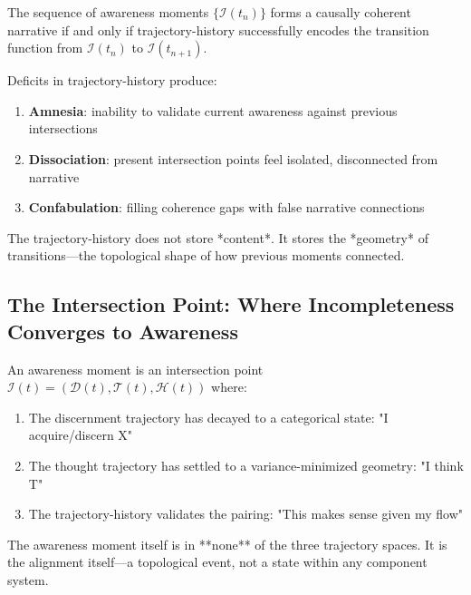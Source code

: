 \begin{theorem}
\label{thm:coherence-history}
The sequence of awareness moments $\{\mathcal{I}(t_n)\}$ forms a causally coherent narrative if and only if trajectory-history successfully encodes the transition function from $\mathcal{I}(t_n)$ to $\mathcal{I}(t_{n+1})$.

Deficits in trajectory-history produce:
\begin{enumerate}[label=(\arabic*),leftmargin=*]
\item \textbf{Amnesia}: inability to validate current awareness against previous intersections
\item \textbf{Dissociation}: present intersection points feel isolated, disconnected from narrative
\item \textbf{Confabulation}: filling coherence gaps with false narrative connections
\end{enumerate}

The trajectory-history does not store *content*. It stores the *geometry* of transitions—the topological shape of how previous moments connected.
\end{theorem}

\subsection{The Intersection Point: Where Incompleteness Converges to Awareness}

\begin{definition}
\label{def:awareness-point}
An awareness moment is an intersection point $\mathcal{I}(t) = (\mathcal{D}(t), \mathcal{T}(t), \mathcal{H}(t))$ where:

\begin{enumerate}[label=(\roman*),leftmargin=*]
\item The discernment trajectory has decayed to a categorical state: "I acquire/discern X"
\item The thought trajectory has settled to a variance-minimized geometry: "I think T"
\item The trajectory-history validates the pairing: "This makes sense given my flow"
\end{enumerate}

The awareness moment itself is in **none** of the three trajectory spaces. It is the alignment itself—a topological event, not a state within any component system.
\end{definition}

